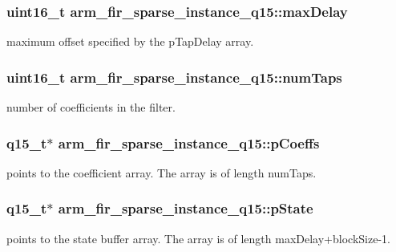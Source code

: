 \subsubsection[{\texorpdfstring{max\+Delay}{maxDelay}}]{\setlength{\rightskip}{0pt plus 5cm}uint16\+\_\+t arm\+\_\+fir\+\_\+sparse\+\_\+instance\+\_\+q15\+::max\+Delay}\hypertarget{structarm__fir__sparse__instance__q15_ad14cc1070eecf7e1926d8f67a8273182}{}\label{structarm__fir__sparse__instance__q15_ad14cc1070eecf7e1926d8f67a8273182}
maximum offset specified by the p\+Tap\+Delay array. 
\subsubsection[{\texorpdfstring{num\+Taps}{numTaps}}]{\setlength{\rightskip}{0pt plus 5cm}uint16\+\_\+t arm\+\_\+fir\+\_\+sparse\+\_\+instance\+\_\+q15\+::num\+Taps}\hypertarget{structarm__fir__sparse__instance__q15_a0f66b126dd8b85f7467cfb01b7bc4d77}{}\label{structarm__fir__sparse__instance__q15_a0f66b126dd8b85f7467cfb01b7bc4d77}
number of coefficients in the filter. 
\subsubsection[{\texorpdfstring{p\+Coeffs}{pCoeffs}}]{\setlength{\rightskip}{0pt plus 5cm}q15\+\_\+t$\ast$ arm\+\_\+fir\+\_\+sparse\+\_\+instance\+\_\+q15\+::p\+Coeffs}\hypertarget{structarm__fir__sparse__instance__q15_a78a6565473b5f0b8c77c3f0f58a76069}{}\label{structarm__fir__sparse__instance__q15_a78a6565473b5f0b8c77c3f0f58a76069}
points to the coefficient array. The array is of length num\+Taps. 
\subsubsection[{\texorpdfstring{p\+State}{pState}}]{\setlength{\rightskip}{0pt plus 5cm}q15\+\_\+t$\ast$ arm\+\_\+fir\+\_\+sparse\+\_\+instance\+\_\+q15\+::p\+State}\hypertarget{structarm__fir__sparse__instance__q15_a98b92b0f5208110129b9a67b1db90408}{}\label{structarm__fir__sparse__instance__q15_a98b92b0f5208110129b9a67b1db90408}
points to the state buffer array. The array is of length max\+Delay+block\+Size-\/1. 
